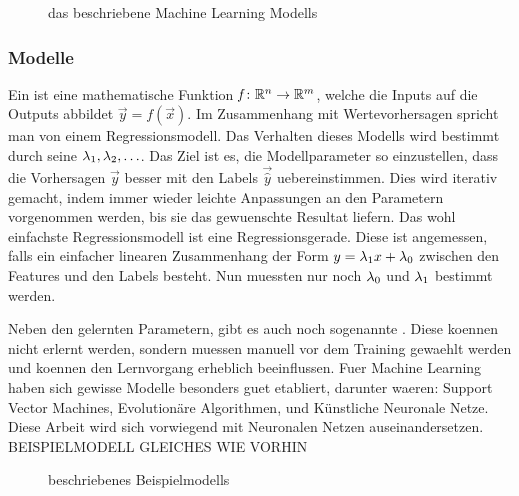 \documentclass[../main]{subfiles}
\begin{document}
\begin{figure}[h!]
  \centering
  \begin{tikzpicture}[node distance=5cm,auto]

  \end{tikzpicture}

  \caption{das beschriebene Machine Learning Modells}
\end{figure}

\subsubsection{Modelle}
Ein  ist eine mathematische Funktion $\mathit{f}\colon \set{R}^n \to \set{R}^m$, welche die Inputs auf die Outputs abbildet $\vec{y}=\mathit{f}(\vec{x})$.
Im Zusammenhang mit Wertevorhersagen spricht man von einem Regressionsmodell.
Das Verhalten dieses Modells wird bestimmt durch seine  $\hyperp_1, \hyperp_2,\ldots$.
Das Ziel ist es, die Modellparameter so einzustellen, dass die Vorhersagen $\vec{y}$ besser mit den Labels $\vec{\hat{y}}$ uebereinstimmen.
Dies wird iterativ gemacht, indem immer wieder leichte Anpassungen an den Parametern vorgenommen werden, bis sie das gewuenschte Resultat liefern.
\para{}
Das wohl einfachste Regressionsmodell ist eine Regressionsgerade. Diese ist
angemessen, falls ein einfacher linearen Zusammenhang der Form $y=\hyperp_1x +
\hyperp_0$ zwischen den Features und den Labels besteht.
Nun muessten nur noch $\hyperp_0$ und $\hyperp_1$ bestimmt werden.

Neben den gelernten Parametern, gibt es auch noch sogenannte .
Diese koennen nicht erlernt werden, sondern muessen manuell vor dem Training gewaehlt werden und koennen den Lernvorgang erheblich beeinflussen.
\para{}
Fuer Machine Learning haben sich gewisse Modelle besonders guet etabliert,
darunter waeren: Support Vector Machines, Evolutionäre Algorithmen, und Künstliche Neuronale Netze.
Diese Arbeit wird sich vorwiegend mit Neuronalen Netzen auseinandersetzen.
\para{}
BEISPIELMODELL GLEICHES WIE VORHIN

\begin{figure}[h!]
  \centering


  \caption{beschriebenes Beispielmodells}
\end{figure}
\end{document}
